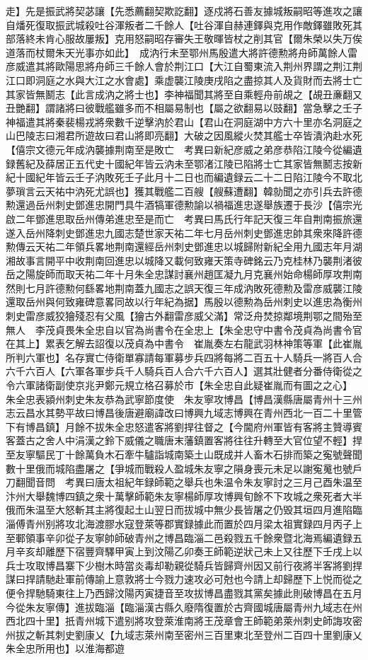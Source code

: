 走】先是振武將契苾讓【先悉薦翻契欺訖翻】逐戍將石善友據城叛嗣昭等進攻之讓自燔死復取振武城殺吐谷渾叛者二千餘人【吐谷渾自赫連鐸與克用作敵鐸雖敗死其部落終未肯心服故屢叛】克用怒嗣昭存審失王敬暉皆杖之削其官【爾朱榮以失万俟道落而杖爾朱天光事亦如此】　成汭行未至鄂州馬殷遣大將許德勲將舟師萬餘人雷彦威遣其將歐陽思將舟師三千餘人會於荆江口【大江自蜀東流入荆州界謂之荆江荆江口即洞庭之水與大江之水會處】乘虚襲江陵庚戌陷之盡掠其人及貨財而去將士亡其家皆無鬭志【此言成汭之將士也】李神福聞其將至自乘輕舟前覘之【覘丑亷翻又丑艷翻】謂諸將曰彼戰艦雖多而不相屬易制也【屬之欲翻易以豉翻】當急擊之壬子神福遣其將秦裴楊戎將衆數千逆擊汭於君山【君山在洞庭湖中方六十里亦名洞庭之山巴陵志曰湘君所遊故曰君山將即亮翻】大破之因風縱火焚其艦士卒皆潰汭赴水死【僖宗文德元年成汭襲據荆南至是敗亡　考異曰新紀彦威之弟彦恭陷江陵今從編遺録舊紀及薛居正五代史十國紀年皆云汭未至鄂渚江陵已陷將士亡其家皆無鬭志按新紀十國紀年皆云壬子汭敗死壬子此月十二日也而編遺録云二十二日陷江陵今不取北夢瑣言云天祐中汭死尤誤也】獲其戰艦二百艘【艘蘇遭翻】韓勍聞之亦引兵去許德勲還過岳州刺史鄧進忠開門具牛酒犒軍德勲諭以禍福進忠遂舉族遷于長沙【僖宗光啟二年鄧進思取岳州傳弟進忠至是而亡　考異曰馬氏行年記天復三年自荆南振旅還遂入岳州降刺史鄧進忠九國志楚世家天祐二年七月岳州刺史鄧進忠帥其衆來降許德勲傳云天祐二年領兵畧地荆南還經岳州刺史鄧進忠以城歸附新紀全用九國志年月湖湘故事言開平中收荆南回進忠以城降又載何致雍天策寺碑銘云乃克桂林乃襲荆渚彼岳之陽旋師而取天祐二年十月朱全忠謀討襄州趙匡凝九月克襄州始命楊師厚攻荆南然則七月許德勲何繇畧地荆南蓋九國志之誤天復三年成汭敗死德勲及雷彦威襲江陵還取岳州與何致雍碑意畧同故以行年紀為据】馬殷以德勲為岳州刺史以進忠為衡州刺史雷彦威狡獪殘忍有父風【獪古外翻雷彦威父滿】常泛舟焚掠鄰境荆鄂之間殆至無人　李茂貞畏朱全忠自以官為尚書令在全忠上【朱全忠守中書令茂貞為尚書令官在其上】累表乞解去詔復以茂貞為中書令　崔胤奏左右龍武羽林神策等軍【此崔胤所判六軍也】名存實亡侍衛單寡請每軍募步兵四將每將二百五十人騎兵一將百人合六千六百人【六軍各軍步兵千人騎兵百人合六千六百人】選其壯健者分番侍衛從之令六軍諸衛副使京兆尹鄭元規立格召募於市【朱全忠自此疑崔胤而有圖之之心】　朱全忠表潁州刺史朱友恭為武寧節度使　朱友寧攻博昌【博昌漢縣唐屬青州十三州志云昌水其勢平故曰博昌後唐避廟諱改曰博興九域志博興在青州西北一百二十里管下有博昌鎮】月餘不拔朱全忠怒遣客將劉捍往督之【今閫府州軍皆有客將主贊導賓客蓋古之舍人中涓漢之鈴下威儀之職唐末藩鎮置客將往往升轉至大官位望不輕】捍至友寧驅民丁十餘萬負木石牽牛驢詣城南築土山既成并人畜木石排而築之寃號聲聞數十里俄而城陷盡屠之【爭城而戰殺人盈城朱友寧之隕身喪元未足以謝寃䰟也號戶刀翻聞音問　考異曰唐太祖紀年録師範之舉兵也朱温令朱友寧討之三月己酉朱温至汴州大舉魏博四鎮之衆十萬擊師範朱友寧楊師厚攻博興旬餘不下攻城之衆死者大半俄而朱温至大怒斬其主將復起土山翌日而拔城中無少長皆屠之仍毁其垣四月進陷臨淄傅青州别將攻北海渡膠水寇登萊等郡實録據此而置於四月梁太祖實録四月丙子上至鄆領事辛卯從子友寧帥師破青州之博昌臨淄二邑殺戮五千餘衆暨北海焉編遺録五月辛亥却離歷下宿豐齊驛甲寅上到汶陽乙卯奏王師範逆狀己未上又往歷下壬戌上以兵士攻取博昌寨下少樹木時當炎毒却勒親從騎兵皆歸齊州因又前行夜將半客將劉捍謀曰捍請馳赴軍前傳諭上意敦將士今戮力速攻必可尅也今請上却歸歷下上悦而從之便令捍馳騎東往上乃西歸汶陽丙寅捷音至攻拔博昌盡戮其黨矣據此則破博昌在五月今從朱友寧傳】進拔臨淄【臨淄漢古縣久廢隋復置於古齊國城唐屬青州九域志在州西北四十里】扺青州城下遣别將攻登萊淮南將王茂章會王師範弟萊州刺史師誨攻密州拔之斬其刺史劉康乂【九域志萊州南至密州三百里東北至登州二百四十里劉康乂朱全忠所用也】以淮海都遊